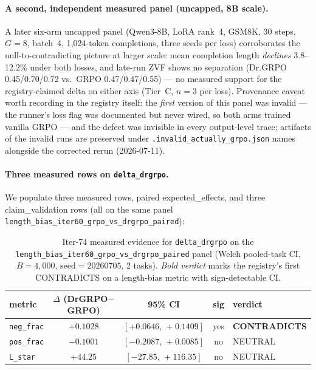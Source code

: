 \paragraph{A second, independent measured panel (uncapped, 8B scale).}
A later six-arm uncapped panel (Qwen3-8B, LoRA rank~4, GSM8K, 30 steps,
$G{=}8$, batch~4, 1{,}024-token completions, three seeds per loss)
corroborates the null-to-contradicting picture at larger scale: mean
completion length \emph{declines} 3.8--12.2\% under both losses, and
late-run ZVF shows no separation (Dr.GRPO 0.45/0.70/0.72 vs.\ GRPO
0.47/0.47/0.55) --- no measured support for the registry-claimed delta
on either axis (Tier~C, $n{=}3$ per loss). Provenance caveat worth
recording in the registry itself: the \emph{first} version of this panel
was invalid --- the runner's loss flag was documented but never wired,
so both arms trained vanilla GRPO --- and the defect was invisible in
every output-level trace; artifacts of the invalid runs are preserved
under \texttt{.invalid\_actually\_grpo.json} names alongside the
corrected rerun (2026-07-11).

\paragraph{Three measured rows on \texttt{delta\_drgrpo}.}
We populate three measured rows, paired expected\_effects, and three
claim\_validation rows (all on the same panel
\texttt{length\_bias\_iter60\_grpo\_vs\_drgrpo\_paired}):

\begin{table}[h]
\centering\scriptsize
\caption{Iter-74 measured evidence for \texttt{delta\_drgrpo} on the
\texttt{length\_bias\_iter60\_grpo\_vs\_drgrpo\_paired} panel
(Welch pooled-task CI, $B=4{,}000$, $\text{seed}=20260705$, 2 tasks).
\emph{Bold verdict} marks the registry's first CONTRADICTS on a
length-bias metric with sign-detectable CI.}
\label{tab:p6-drgrpo-measured}
\begin{tabular}{l c c c l}
\toprule
metric & $\Delta$ (DrGRPO$-$GRPO) & 95\% CI & sig & verdict \\
\midrule
\texttt{neg\_frac}  & $+0.1028$ & $[+0.0646,\,+0.1409]$ & yes & \textbf{CONTRADICTS} \\
\texttt{pos\_frac}  & $-0.1001$ & $[-0.2087,\,+0.0085]$ & no  & NEUTRAL \\
\texttt{L\_star}    & $+44.25$  & $[-27.85,\,+116.35]$  & no  & NEUTRAL \\
\bottomrule
\end{tabular}
\end{table}

